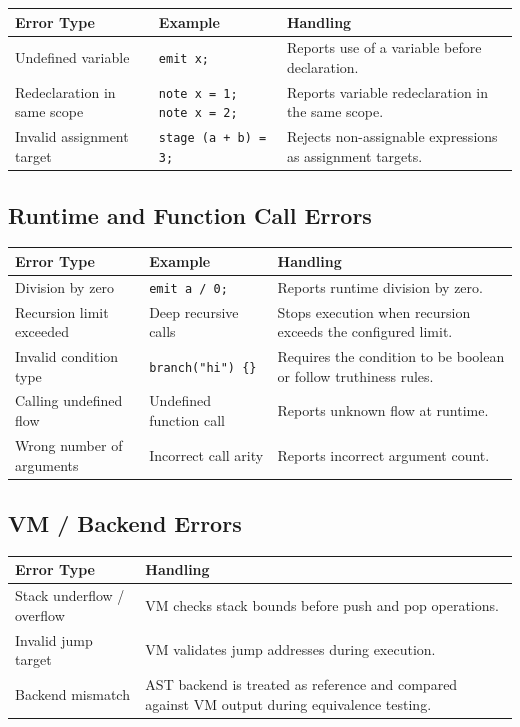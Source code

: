 \documentclass[12pt,a4paper]{article}
\begin{document}
\begin{table}[H]
\centering
\begin{tabularx}{\textwidth}{l X X}
\toprule
\textnormal{Error Type} & \textnormal{Example} & \textnormal{Handling} \\
\midrule
Undefined variable & \texttt{emit x;} & Reports use of a variable before declaration. \\
Redeclaration in same scope & \texttt{note x = 1; note x = 2;} & Reports variable redeclaration in the same scope. \\
Invalid assignment target & \texttt{stage (a + b) = 3;} & Rejects non-assignable expressions as assignment targets. \\
\bottomrule
\end{tabularx}
\end{table}

\subsection*{Runtime and Function Call Errors}

\begin{table}[H]
\centering
\begin{tabularx}{\textwidth}{l X X}
\toprule
\textnormal{Error Type} & \textnormal{Example} & \textnormal{Handling} \\
\midrule
Division by zero & \texttt{emit a / 0;} & Reports runtime division by zero. \\
Recursion limit exceeded & Deep recursive calls & Stops execution when recursion exceeds the configured limit. \\
Invalid condition type & \texttt{branch("hi") \{\}} & Requires the condition to be boolean or follow truthiness rules. \\
Calling undefined flow & Undefined function call & Reports unknown flow at runtime. \\
Wrong number of arguments & Incorrect call arity & Reports incorrect argument count. \\
\bottomrule
\end{tabularx}
\end{table}

\subsection*{VM / Backend Errors}

\begin{table}[H]
\centering
\begin{tabularx}{\textwidth}{l X}
\toprule
\textnormal{Error Type} & \textnormal{Handling} \\
\midrule
Stack underflow / overflow & VM checks stack bounds before push and pop operations. \\
Invalid jump target & VM validates jump addresses during execution. \\
Backend mismatch & AST backend is treated as reference and compared against VM output during equivalence testing. \\
\bottomrule
\end{tabularx}
\end{table}
\end{document}
